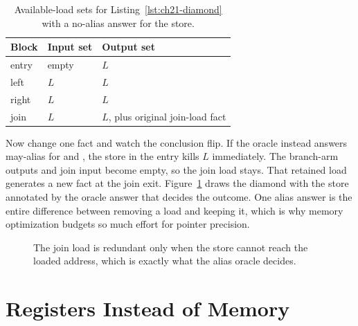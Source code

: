 \begin{table}
  \centering
  \caption{Available-load sets for Listing~\ref{lst:ch21-diamond} with a no-alias answer for the store.}
  \label{tab:ch21-avail}
  \begin{tabular}{lll}
    \toprule
    Block & Input set & Output set \\
    \midrule
    entry & empty & $L$ \\
    left & $L$ & $L$ \\
    right & $L$ & $L$ \\
    join & $L$ & $L$, plus original join-load fact \\
    \bottomrule
  \end{tabular}
\end{table}

Now change one fact and watch the conclusion flip.
If the oracle instead answers may-alias for  and , the store in the entry kills $L$ immediately.
The branch-arm outputs and join input become empty, so the join load stays.
That retained load generates a new fact at the join exit.
Figure~\ref{fig:ch21-diamond} draws the diamond with the store annotated by the oracle answer that decides the outcome.
One alias answer is the entire difference between removing a load and keeping it, which is why memory optimization budgets so much effort for pointer precision.

\begin{figure}
  \centering
  \caption{The join load is redundant only when the store cannot reach the loaded address, which is exactly what the alias oracle decides.}
  \label{fig:ch21-diamond}
\end{figure}

\section{Registers Instead of Memory}
\label{sec:ch21-registers}


